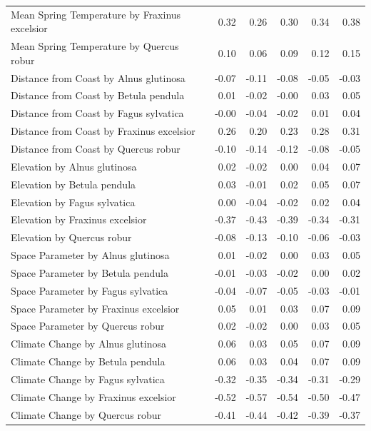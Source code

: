 \documentclass{article}\usepackage[]{graphicx}\usepackage[]{color}
\begin{document}
{\begin{table}[H]
\begin{tabular}{lrrrrr}
  Mean Spring 
Temperature by Fraxinus excelsior & 0.32 & 0.26 & 0.30 & 0.34 & 0.38 \\ 
  Mean Spring 
Temperature by Quercus robur & 0.10 & 0.06 & 0.09 & 0.12 & 0.15 \\ 
  Distance from 
Coast by Alnus glutinosa & -0.07 & -0.11 & -0.08 & -0.05 & -0.03 \\ 
  Distance from 
Coast by Betula pendula & 0.01 & -0.02 & -0.00 & 0.03 & 0.05 \\ 
  Distance from 
Coast by Fagus sylvatica & -0.00 & -0.04 & -0.02 & 0.01 & 0.04 \\ 
  Distance from 
Coast by Fraxinus excelsior & 0.26 & 0.20 & 0.23 & 0.28 & 0.31 \\ 
  Distance from 
Coast by Quercus robur & -0.10 & -0.14 & -0.12 & -0.08 & -0.05 \\ 
  Elevation by Alnus glutinosa & 0.02 & -0.02 & 0.00 & 0.04 & 0.07 \\ 
  Elevation by Betula pendula & 0.03 & -0.01 & 0.02 & 0.05 & 0.07 \\ 
  Elevation by Fagus sylvatica & 0.00 & -0.04 & -0.02 & 0.02 & 0.04 \\ 
  Elevation by Fraxinus excelsior & -0.37 & -0.43 & -0.39 & -0.34 & -0.31 \\ 
  Elevation by Quercus robur & -0.08 & -0.13 & -0.10 & -0.06 & -0.03 \\ 
  Space Parameter by Alnus glutinosa & 0.01 & -0.02 & 0.00 & 0.03 & 0.05 \\ 
  Space Parameter by Betula pendula & -0.01 & -0.03 & -0.02 & 0.00 & 0.02 \\ 
  Space Parameter by Fagus sylvatica & -0.04 & -0.07 & -0.05 & -0.03 & -0.01 \\ 
  Space Parameter by Fraxinus excelsior & 0.05 & 0.01 & 0.03 & 0.07 & 0.09 \\ 
  Space Parameter by Quercus robur & 0.02 & -0.02 & 0.00 & 0.03 & 0.05 \\ 
  Climate Change by Alnus glutinosa & 0.06 & 0.03 & 0.05 & 0.07 & 0.09 \\ 
  Climate Change by Betula pendula & 0.06 & 0.03 & 0.04 & 0.07 & 0.09 \\ 
  Climate Change by Fagus sylvatica & -0.32 & -0.35 & -0.34 & -0.31 & -0.29 \\ 
  Climate Change by Fraxinus excelsior & -0.52 & -0.57 & -0.54 & -0.50 & -0.47 \\ 
  Climate Change by Quercus robur & -0.41 & -0.44 & -0.42 & -0.39 & -0.37 \\ 

\end{tabular}
\end{table}}
\end{document}
